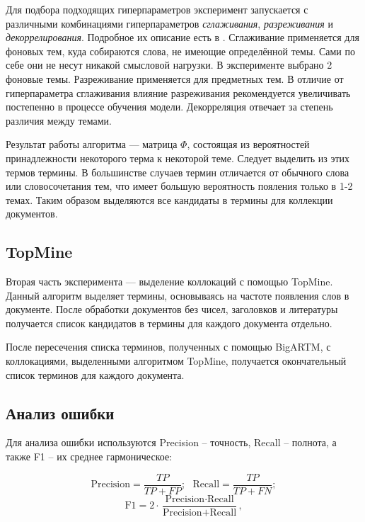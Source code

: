 \documentclass[a4paper, 12pt]{article}
\begin{document}
    Для подбора подходящих гиперпараметров эксперимент запускается с различными комбинациями гиперпараметров \textit{сглаживания}, \textit{разреживания} и \textit{декоррелирования}. Подробное их описание есть в \citep{Vorontsov2014}. Сглаживание применяется для фоновых тем, куда собираются слова, не имеющие определённой темы. Сами по себе они не несут никакой смысловой нагрузки. В эксперименте выбрано 2 фоновые темы. Разреживание применяется для предметных тем. В отличие от гиперпараметра сглаживания влияние разреживания рекомендуется увеличивать постепенно в процессе обучения модели. Декорреляция отвечает за степень различия между темами.

    Результат работы алгоритма --- матрица $\Phi$, состоящая из вероятностей принадлежности некоторого терма к некоторой теме. Следует выделить из этих термов термины. В большинстве случаев термин отличается от обычного слова или словосочетания тем, что имеет большую вероятность пояления только в 1-2 темах. Таким образом выделяются все кандидаты в термины для коллекции документов.

\subsection{TopMine}
    Вторая часть эксперимента --- выделение коллокаций с помощью TopMine. Данный алгоритм выделяет термины, основываясь на частоте появления слов в документе. После обработки документов без чисел, заголовков и литературы получается список кандидатов в термины для каждого документа отдельно.

    После пересечения списка терминов, полученных с помощью BigARTM, с коллокациями, выделенными алгоритмом TopMine, получается окончательный список терминов для каждого документа.

\subsection{Анализ ошибки}
    Для анализа ошибки используются Precision -- точность, Recall -- полнота, а также F1 -- их среднее гармоническое:

    \begin{equation}
        \text{Precision} = \frac{TP}{TP + FP}; ~~~ \text{Recall} = \frac{TP}{TP + FN};
    \end{equation}
    \begin{equation}
        \text{F1} = 2 \cdot \frac{\text{Precision} \cdot \text{Recall}}{\text{Precision} + \text{Recall}},
    \end{equation}
\end{document}
